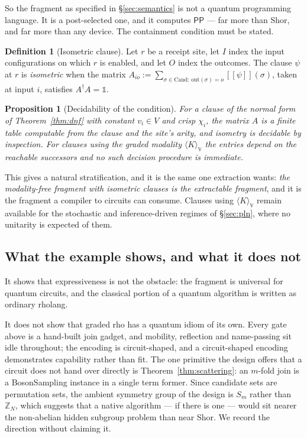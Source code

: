 \documentclass[11pt,a4paper]{article}
\theoremstyle{plain}
\newtheorem{proposition}[theorem]{Proposition}
\theoremstyle{definition}
\newtheorem{definition}[theorem]{Definition}
\theoremstyle{remark}
\newcommand{\sem}[1]{[\![#1]\!]}
\newcommand{\V}{\mathbb{V}}
\newcommand{\Cand}{\mathrm{Cand}}
\newcommand{\Out}{\mathrm{out}}
\begin{document}
So the fragment as specified in \S\ref{sec:semantics} is not a quantum
programming language. It is a post-selected one, and it computes $\mathsf{PP}$
--- far more than Shor, and far more than any device. The containment condition
must be stated.

\begin{definition}[Isometric clause]\label{def:isometric}
Let $r$ be a receipt site, let $I$ index the input configurations on which $r$ is
enabled, and let $O$ index the outcomes. The clause $\psi$ at $r$ is
\emph{isometric} when the matrix $A_{io} := \sum_{\sigma \in \Cand:\,
\Out(\sigma)=o} \sem{\psi}(\sigma)$, taken at input $i$, satisfies
$A^{\dagger}A = \mathbb{1}$.
\end{definition}

\begin{proposition}[Decidability of the condition]\label{prop:decidable}
For a clause of the normal form of Theorem~\ref{thm:dnf} with constant
$v_i \in V$ and crisp $\chi_i$, the matrix $A$ is a finite table computable from
the clause and the site's arity, and isometry is decidable by inspection. For
clauses using the graded modality $\langle K\rangle_\V$ the entries depend on
the reachable successors and no such decision procedure is immediate.
\end{proposition}

This gives a natural stratification, and it is the same one extraction wants:
\emph{the modality-free fragment with isometric clauses is the extractable
fragment}, and it is the fragment a compiler to circuits can consume. Clauses
using $\langle K\rangle_\V$ remain available for the stochastic and
inference-driven regimes of \S\ref{sec:pln}, where no unitarity is expected of
them.

\subsection{What the example shows, and what it does not}

It shows that expressiveness is not the obstacle: the fragment is universal for
quantum circuits, and the classical portion of a quantum algorithm is written as
ordinary rholang.

It does not show that graded rho has a quantum idiom of its own. Every gate above
is a hand-built join gadget, and mobility, reflection and name-passing sit idle
throughout; the encoding is circuit-shaped, and a circuit-shaped encoding
demonstrates capability rather than fit. The one primitive the design offers that
a circuit does not hand over directly is Theorem~\ref{thm:scattering}: an
$m$-fold join is a BosonSampling instance in a single term former. Since
candidate sets are permutation sets, the ambient symmetry group of the design is
$S_m$ rather than $\mathbb{Z}_N$, which suggests that a native algorithm --- if
there is one --- would sit nearer the non-abelian hidden subgroup problem than
near Shor. We record the direction without claiming it.
\end{document}
